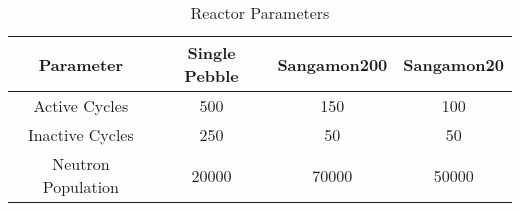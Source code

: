 \begin{table}[h!]
\centering
\caption{Reactor Parameters}
\begin{tabular}{ c  c  c  c }
\hline
Parameter & Single Pebble & Sangamon200 & Sangamon20 \\
\hline
Active Cycles & 500 & 150 & 100 \\
Inactive Cycles & 250 & 50 & 50  \\
Neutron Population & 20000 & 70000 & 50000 \\
\hline
\end{tabular}

\label{table:run-params}
\end{table}